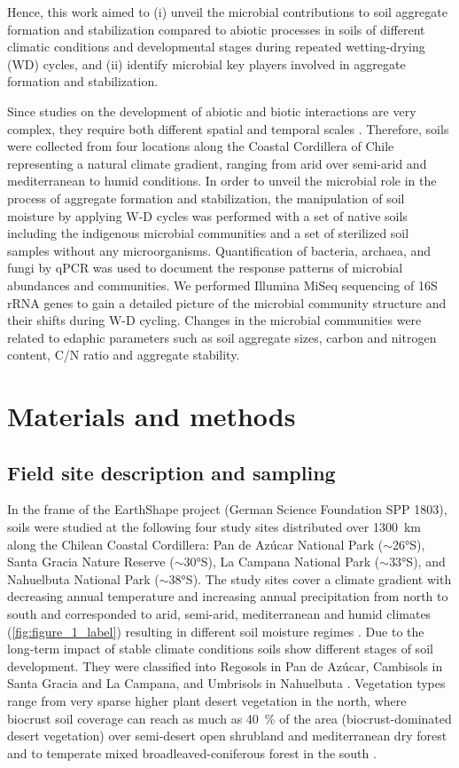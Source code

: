 Hence, this work aimed to (i) unveil the microbial contributions to soil aggregate formation and stabilization compared to abiotic processes in soils of different climatic conditions and developmental stages during repeated wetting-drying (WD) cycles, and (ii) identify microbial key players involved in aggregate formation and stabilization.

Since studies on the development of abiotic and biotic interactions are very complex, they require both different spatial and temporal scales \citep{Ollivier2011}. Therefore, soils were collected from four locations along the Coastal Cordillera of Chile representing a natural climate gradient, ranging from arid over semi-arid and mediterranean to humid conditions. In order to unveil the microbial role in the process of aggregate formation and stabilization, the manipulation of soil moisture by applying W-D cycles was performed with a set of native soils including the indigenous microbial communities and a set of sterilized soil samples without any microorganisms. Quantification of bacteria, archaea, and fungi by qPCR was used to document the response patterns of microbial abundances and communities. We performed Illumina MiSeq sequencing of 16S rRNA genes to gain a detailed picture of the microbial community structure and their shifts during W-D cycling. Changes in the microbial communities were related to edaphic parameters such as soil aggregate sizes, carbon and nitrogen content, C/N ratio and aggregate stability.

\section{Materials and methods}
\subsection{Field site description and sampling}

In the frame of the EarthShape project (German Science Foundation SPP 1803), soils were studied at the following four study sites distributed over \SI{1300}{\kilo\metre} along the Chilean Coastal Cordillera: Pan de Az{\'u}car National Park (\(\sim\)\ang{26}S), Santa Gracia Nature Reserve (\(\sim\)\ang{30}S), La Campana National Park (\(\sim\)\ang{33}S), and Nahuelbuta National Park (\(\sim\)\ang{38}S). 
The study sites cover a climate gradient with decreasing annual temperature and increasing annual precipitation from north to south and corresponded to arid, semi-arid, mediterranean and humid climates (\cref{fig:figure_1_label}) resulting in different soil moisture regimes \citep{Bernhard2018}. 
Due to the long-term impact of stable climate conditions \citep{Ewing2006} soils show different stages of soil development. 
They were classified into Regosols in Pan de Az{\'u}car, Cambisols in Santa Gracia and La Campana, and Umbrisols in Nahuelbuta \citep{Bernhard2018b}. 
Vegetation types range from very sparse higher plant desert vegetation in the north, where biocrust soil coverage can reach as much as \SI{40}{\percent} of the area (biocrust-dominated desert vegetation) over semi-desert open shrubland and mediterranean dry forest and to temperate mixed broadleaved-coniferous forest in the south \citep{Bernhard2018a, Bernhard2018b}.

